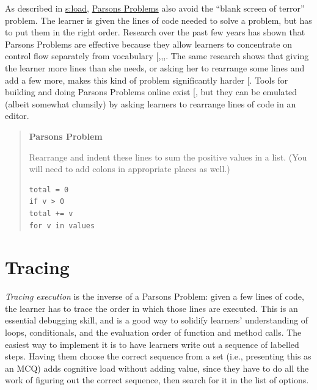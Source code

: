As described in \protect\hyperlink{CHAPTER}{s:load}, \protect\hyperlink{g:parsons-problem}{Parsons
Problems} also avoid the ``blank screen of terror''
problem. The learner is given the lines of code needed to solve a
problem, but has to put them in the right order. Research over the
past few years has shown that Parsons Problems are effective because
they allow learners to concentrate on control flow separately from
vocabulary
{[},,,\protect[\hyperlink{b:Eric2017}{Eric2017}]{]}. The
same research shows that giving the learner more lines than she needs,
or asking her to rearrange some lines and add a few more, makes this
kind of problem significantly harder {[}\protect[\hyperlink{b:Harm2016}{Harm2016}]{]}. Tools for
building and doing Parsons Problems online exist {[}\protect[\hyperlink{b:Ihan2011}{Ihan2011}]{]},
but they can be emulated (albeit somewhat clumsily) by asking learners
to rearrange lines of code in an editor.

\begin{quote}\setlength{\parindent}{0pt}
\textbf{Parsons Problem}

Rearrange and indent these lines to sum the positive values in a list.
(You will need to add colons in appropriate places as well.)

\begin{lstlisting}
total = 0
if v > 0
total += v
for v in values
\end{lstlisting}
\end{quote}

\section{Tracing}\label{s:exercises-tracing}

\emph{Tracing execution} is the inverse of a Parsons Problem: given a few
lines of code, the learner has to trace the order in which those lines
are executed. This is an essential debugging skill, and is a good way to
solidify learners' understanding of loops, conditionals, and the
evaluation order of function and method calls. The easiest way to
implement it is to have learners write out a sequence of labelled steps.
Having them choose the correct sequence from a set (i.e., presenting
this as an MCQ) adds cognitive load without adding value, since they
have to do all the work of figuring out the correct sequence, then
search for it in the list of options.

